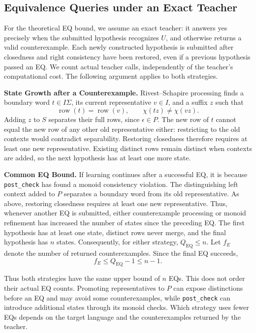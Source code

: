 \documentclass{ieice-tecrep}
\begin{document}
\subsection{Equivalence Queries under an Exact Teacher}\label{complexity-equivalence-queries}

For the theoretical EQ bound, we assume an exact teacher: it answers
yes precisely when the submitted hypothesis recognizes \(U\), and
otherwise returns a valid counterexample. Each newly constructed
hypothesis is submitted after closedness and right consistency have
been restored, even if a previous hypothesis passed an EQ. We count
actual teacher calls, independently of the teacher's computational
cost. The following argument applies to both strategies.

\textbf{State Growth after a Counterexample.}
Rivest--Schapire processing finds a boundary word \(t\in I\Sigma\),
its current representative \(v\in I\), and a suffix \(z\) such that
\[
\operatorname{row}(t)=\operatorname{row}(v),\qquad
\chi(tz)\ne\chi(vz).
\]
Adding \(z\) to \(S\) separates their full rows, since
\(\epsilon\in P\). The new row of \(t\) cannot equal the new row
of any other old representative either: restricting to the old
contexts would contradict separability. Restoring closedness
therefore requires at least one new representative. Existing distinct
rows remain distinct when contexts are added, so the next hypothesis
has at least one more state.

\textbf{Common EQ Bound.}
If learning continues after a successful EQ, it is because
\texttt{post\_check} has found a monoid consistency violation.
The distinguishing left context added to \(P\) separates a boundary
word from its old representative. As above, restoring closedness
requires at least one new representative. Thus, whenever another EQ
is submitted, either counterexample processing or monoid refinement
has increased the number of states since the preceding EQ. The first
hypothesis has at least one state, distinct rows never merge, and the
final hypothesis has \(n\) states. Consequently, for either strategy, \(Q_{\mathrm{EQ}}\le n\).
Let \(f_E\) denote the number of returned counterexamples. Since the
final EQ succeeds,
\[
f_E\le Q_{\mathrm{EQ}}-1\le n-1.
\]

Thus both strategies have the same upper bound of \(n\) EQs. This
does not order their actual EQ counts. Promoting representatives to
\(P\) can expose distinctions before an EQ and may avoid some
counterexamples, while \texttt{post\_check} can introduce additional
states through its monoid checks. Which strategy uses fewer EQs
depends on the target language and the counterexamples returned by
the teacher.
\end{document}
